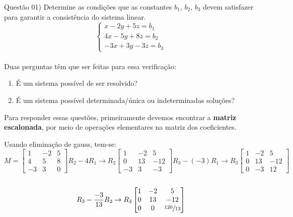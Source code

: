 
\noindent \textcolor{COLOR1}{Questão 01)} Determine as condições que as constantes $b_1$, $b_2$, $b_3$ devem satisfazer para garantir a consistência do sistema linear.
\\

\[
    \begin{cases}
        x - 2y + 5z = b_1  \\
        4x - 5y + 8z = b_2 \\
        -3x + 3y - 3z = b_3
    \end{cases}
\]
\\

Duas perguntas têm que ser feitas para essa verificação:
\\

\begin{enumerate}[label=(\alph*)]
    \item É um sistema possível de ser resolvido?
    \item É um sistema possível determinada/única ou indeterminadas soluções?
\end{enumerate}

Para responder essas questões, primeiramente devemos encontrar a \textbf{matriz escalonada}, por meio de operações elementares na matriz dos coeficientes.

Usando eliminação de gauss, tem-se:
\\

\[
    M=
    \begin{bmatrix}
        1  & -2 & 5 \\
        4  & 5  & 8 \\
        -3 & 3  & 0
    \end{bmatrix}
    R_2 - 4R_1 \to R_2
    \begin{bmatrix}
        1  & -2 & 5   \\
        0  & 13 & -12 \\
        -3 & 3  & -3
    \end{bmatrix}
    R_3 - (-3)R_1 \to  R_3
    \begin{bmatrix}
        1 & -2 & 5   \\
        0 & 13 & -12 \\
        0 & -3 & 12
    \end{bmatrix}
\]
\\

\[
    R_3 - \frac{-3}{13}R_2 \to R_3
    \begin{bmatrix}
        1 & -2 & 5               \\
        0 & 13 & -12             \\
        0 & 0  & \sfrac{120}{13}
    \end{bmatrix}
\]
\\

